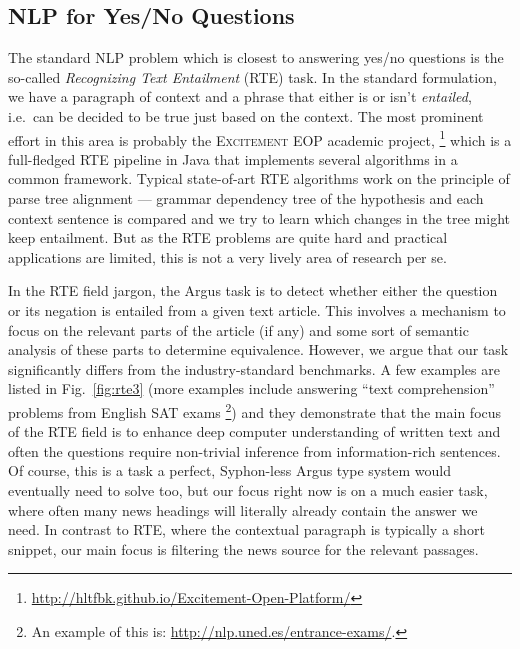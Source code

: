 \documentclass[11pt,a4paper]{article}
\begin{document}
\subsection{NLP for Yes/No Questions}

The standard NLP problem which is closest to answering yes/no questions
is the so-called \textit{Recognizing Text Entailment} (RTE) task.
In the standard formulation,
we have a paragraph of context and a phrase that either is or isn't
\textit{entailed}, i.e.\ can be decided to be true just based on the context.
The most prominent effort in this area is probably the
\textsc{Excitement EOP} academic project,%
\footnote{\url{http://hltfbk.github.io/Excitement-Open-Platform/}}
which is a full-fledged
RTE pipeline in Java that implements several algorithms
in a common framework.
Typical state-of-art RTE algorithms work on the principle of parse tree
alignment --- grammar dependency tree of the hypothesis and each context
sentence is compared and we try to learn which changes in the tree might
keep entailment.
But as the RTE problems are quite hard and practical applications are limited,
this is not a very lively area of research per se.

In the RTE field jargon, the Argus task is to detect whether either the question or
its negation is entailed from a given text article.  This involves
a mechanism to focus on the relevant parts of the article (if any)
and some sort of semantic analysis of these parts to determine
equivalence.
However, we argue that our task significantly differs from
the industry-standard benchmarks.  A few examples are listed in Fig.~\ref{fig:rte3}
(more examples include answering ``text comprehension'' problems from
English SAT exams%
\footnote{An example of this is: \url{http://nlp.uned.es/entrance-exams/}.})
and they demonstrate that the main focus of the RTE field is to enhance
deep computer understanding of written text and often the questions
require non-trivial inference from information-rich sentences.
Of course, this is a task a perfect, Syphon-less Argus type system
would eventually need to solve too, but our focus right now is on a much
easier task, where often many news headings will literally already contain
the answer we need.  In contrast to RTE, where the contextual paragraph is
typically a short snippet, our main focus is filtering the news source for
the relevant passages.
\end{document}
